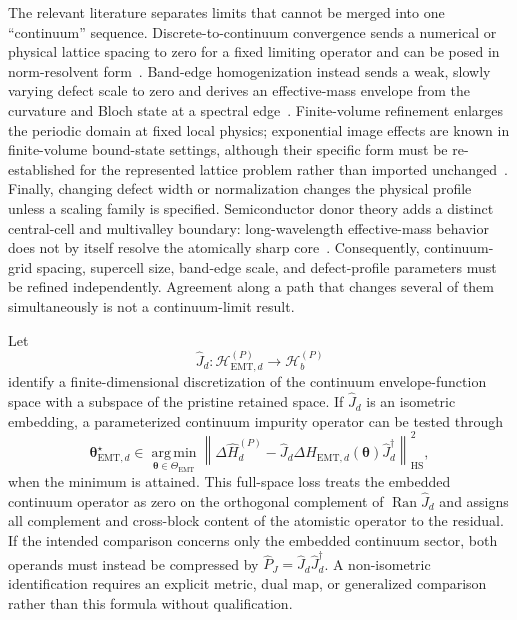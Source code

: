 The relevant literature separates limits that cannot be merged into one
``continuum'' sequence. Discrete-to-continuum convergence sends a numerical or
physical lattice spacing to zero for a fixed limiting operator and can be posed
in norm-resolvent form~\cite{nakamuraTadano2021}. Band-edge homogenization
instead sends a weak, slowly varying defect scale to zero and derives an
effective-mass envelope from the curvature and Bloch state at a spectral
edge~\cite{hoeferWeinstein2011,ducheneVukicevicWeinstein2015}. Finite-volume
refinement enlarges the periodic domain at fixed local physics; exponential
image effects are known in finite-volume bound-state settings, although their
specific form must be re-established for the represented lattice problem rather
than imported unchanged~\cite{koenigLeeHammer2011}. Finally, changing defect
width or normalization changes the physical profile unless a scaling family is
specified. Semiconductor donor theory adds a distinct central-cell and
multivalley boundary: long-wavelength effective-mass behavior does not by itself
resolve the atomically sharp core~\cite{kohnLuttinger1955donor,gamble2015}.
Consequently, continuum-grid spacing, supercell size, band-edge scale, and
defect-profile parameters must be refined independently. Agreement along a
path that changes several of them simultaneously is not a continuum-limit
result.

Let
\begin{equation}
    \hat J_d:
    \mathcal H_{\mathrm{EMT},d}^{(P)}
    \longrightarrow
    \mathcal H_b^{(P)}
\end{equation}
identify a finite-dimensional discretization of the continuum envelope-function
space with a subspace of the pristine retained space. If $\hat J_d$ is an
isometric embedding, a parameterized continuum impurity operator can be tested
through
\begin{equation}
    \boldsymbol\theta_{\mathrm{EMT},d}^{\star}
    \in
    \operatorname*{arg\,min}_{\boldsymbol\theta\in\Theta_{\mathrm{EMT}}}
    \left\lVert
        \Delta\hat H_d^{(P)}
        -
        \hat J_d
        \Delta\hat H_{\mathrm{EMT},d}(\boldsymbol\theta)
        \hat J_d^\dagger
    \right\rVert_{\mathrm{HS}}^2,
\end{equation}
when the minimum is attained. This full-space loss treats the embedded
continuum operator as zero on the orthogonal complement of
$\operatorname{Ran}\hat J_d$ and assigns all complement and cross-block content
of the atomistic operator to the residual. If the intended comparison concerns
only the embedded continuum sector, both operands must instead be compressed by
$\hat P_J=\hat J_d\hat J_d^\dagger$. A non-isometric identification requires an
explicit metric, dual map, or generalized comparison rather than this formula
without qualification.

